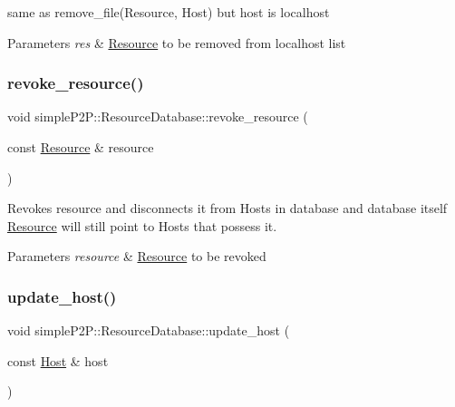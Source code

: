 same as remove\+\_\+file(\+Resource, Host) but host is localhost 


\begin{DoxyParams}{Parameters}
{\em res} & \hyperlink{classsimpleP2P_1_1Resource}{Resource} to be removed from localhost list \\
\hline
\end{DoxyParams}
\mbox{\label{classsimpleP2P_1_1ResourceDatabase_a266b2d64276b46153257b1d798860682}} 
\subsubsection{\texorpdfstring{revoke\+\_\+resource()}{revoke\_resource()}}
{\footnotesize\ttfamily void simple\+P2\+P\+::\+Resource\+Database\+::revoke\+\_\+resource (\begin{DoxyParamCaption}\item[{const \hyperlink{classsimpleP2P_1_1Resource}{Resource} \&}]{resource }\end{DoxyParamCaption})}



Revokes resource and disconnects it from Hosts in database and database itself \hyperlink{classsimpleP2P_1_1Resource}{Resource} will still point to Hosts that possess it. 


\begin{DoxyParams}{Parameters}
{\em resource} & \hyperlink{classsimpleP2P_1_1Resource}{Resource} to be revoked \\
\hline
\end{DoxyParams}
\mbox{\label{classsimpleP2P_1_1ResourceDatabase_a702f98ada572961ce3665bded3b20903}} 
\subsubsection{\texorpdfstring{update\+\_\+host()}{update\_host()}}
{\footnotesize\ttfamily void simple\+P2\+P\+::\+Resource\+Database\+::update\+\_\+host (\begin{DoxyParamCaption}\item[{const \hyperlink{classsimpleP2P_1_1Host}{Host} \&}]{host }\end{DoxyParamCaption})}



